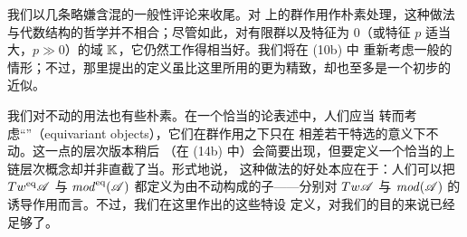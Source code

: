 \begin{remark}\label{thm:naive-group-actions-remarks}
我们以几条略嫌含混的一般性评论来收尾。对 \trACategory{}上的群作用作朴素处理，这种做法
与\trHomotopy{}代数结构的哲学并不相合；尽管如此，对有限群以及特征为 $0$（或特征 $p$
适当大，$p\gg 0$）的\trCoefficients{}域 $\mathbb{K}$，它仍然工作得相当好。我们将在 (10b) 中
重新考虑一般的情形；不过，那里提出的定义虽比这里所用的更为精致，却也至多是一个初步的
近似。

我们对不动\trObject{}的用法也有些朴素。在一个恰当的\trCategory{}论表述中，人们应当
转而考虑“\trEquivariant{}\trObject”（equivariant objects），它们在群作用之下只在
相差若干特选\trIsomorphism{}的意义下不动。这一点的\trCohomology{}层次版本稍后
（在 (14b) 中）会简要出现，但要定义一个恰当的上链层次概念却并非直截了当。形式地说，
这种做法的好处本应在于：人们可以把 $Tw^{\mathrm{eq}}\mathscr{A}$ 与
$\mathit{mod}^{\mathrm{eq}}(\mathscr{A})$ 都定义为由不动\trObject{}构成的子\trCategory{}——分别对
$Tw\mathscr{A}$ 与 $\mathit{mod}(\mathscr{A})$ 的诱导作用而言。不过，我们在这里作出的这些特设
定义，对我们的目的来说已经足够了。
\end{remark}
